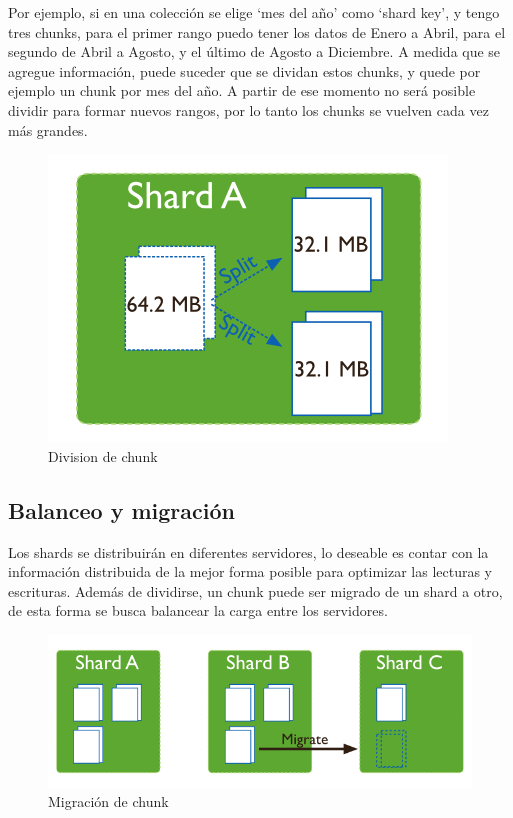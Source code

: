 Por ejemplo, si en una colección se elige `mes del año' como `shard key', y tengo tres
chunks, para el primer rango puedo tener los datos de Enero a Abril, para el segundo de Abril a Agosto, y el último de Agosto a Diciembre.
A medida que se agregue información, puede suceder que se dividan estos chunks, y quede por ejemplo un chunk por mes del año.
A partir de ese momento no será posible dividir para formar nuevos rangos, por lo tanto los chunks se vuelven cada vez más grandes.

\begin{figure}[h!]
 \centering
 \includegraphics[scale=0.5,keepaspectratio=true]{./split-chunk.png}
 \caption{Division de chunk}
\end{figure}

\subsection{Balanceo y migración}

Los shards se distribuirán en diferentes servidores, lo deseable es contar con la información distribuida de la mejor forma
posible para optimizar las lecturas y escrituras. Además de dividirse, un chunk puede ser migrado de un shard a otro, de 
esta forma se busca balancear la carga entre los servidores.

\begin{figure}[h!]
 \centering
 \includegraphics[scale=1,keepaspectratio=true]{./sharding-migrating.png}
 \caption{Migración de chunk}
\end{figure}


